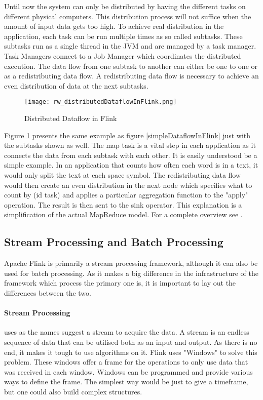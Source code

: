 Until now the system can only be distributed by having the different tasks on different physical computers. This distribution process will not suffice when the amount of input data gets too high. To achieve real distribution in the application, each task can be run multiple times as so called subtasks. These subtasks run as a single thread in the JVM and are managed by a task manager. Task Managers connect to a Job Manager which coordinates the distributed execution. The data flow from one subtask to another can either be one to one or as a redistributing data flow. A redistributing data flow is necessary to achieve an even distribution of data at the next subtasks.

\begin{figure}[h!]
    \centering
      \texttt{[image: rw\_distributedDataflowInFlink.png]}
      \caption{Distributed Dataflow in Flink}
      \label{distributedDataflowInFlink}
\end{figure}

Figure \ref{distributedDataflowInFlink} presents the same example as figure \ref{simpleDataflowInFlink} just with the subtasks shown as well. The map task is a vital step in each application as it connects the data from each subtask with each other. It is easily understood be a simple example. In an application that counts how often each word is in a text, it would only split the text at each space symbol. The redistributing data flow would then create an even distribution in the next node which specifies what to count by (id task) and applies a particular aggregation function to the "apply" operation. The result is then sent to the sink operator. This explanation is a simplification of the actual MapReduce model. For a complete overview see \cite{todo}.

\subsection{Stream Processing and Batch Processing}

Apache Flink is primarily a stream processing framework, although it can also be used for batch processing. As it makes a big difference in the infrastructure of the framework which process the primary one is, it is important to lay out the differences between the two.

\paragraph{Stream Processing} uses as the names suggest a stream to acquire the data. A stream is an endless sequence of data that can be utilised both as an input and output. As there is no end, it makes it tough to use algorithms on it. Flink uses "Windows" to solve this problem. These windows offer a frame for the operations to only use data that was received in each window. Windows can be programmed and provide various ways to define the frame. The simplest way would be just to give a timeframe, but one could also build complex structures.

